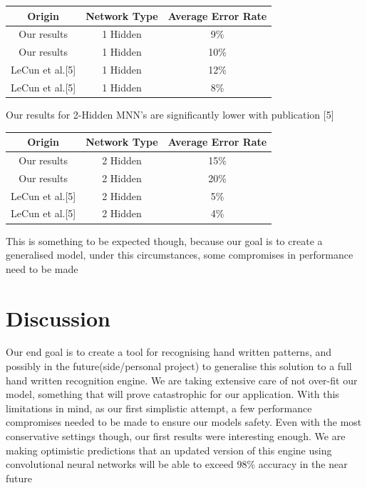 \documentclass{proc}
\begin{document}
	\begin{center}
		\begin{tabular}{ |c|c|c| }
			\hline
			Origin&Network Type&Average Error Rate \\
			\hline
			Our results&1 Hidden& 9\% \\
			Our results&1 Hidden& 10\% \\
			LeCun et al.[5]&1 Hidden  & 12\% \\
			LeCun et al.[5]&1 Hidden  & 8\% \\
			\hline
		\end{tabular}
	\end{center}
 
	Our results for 2-Hidden MNN's are significantly lower with publication [5]
	\begin{center}
		\begin{tabular}{ |c|c|c| }
			\hline
			Origin&Network Type&Average Error Rate \\
			\hline
			Our results&2 Hidden& 15\% \\
			Our results&2 Hidden& 20\% \\
			LeCun et al.[5]&2 Hidden  & 5\% \\
			LeCun et al.[5]&2 Hidden  & 4\% \\
			\hline
		\end{tabular}
	\end{center}

	This is something to be expected though, because our goal is to create a generalised model, under this circumstances, some compromises in performance need to be made
	
	\section{Discussion}
	Our end goal is to create a tool for recognising hand written patterns, and possibly in the future(side/personal project) to generalise this solution to a full hand written recognition engine. We are taking extensive care of not over-fit our model, something that will prove catastrophic for our application. With this limitations in mind, as our first simplistic attempt, a few performance compromises needed to be made to ensure our models safety. Even with the most conservative settings though, our first results were interesting enough. We are making optimistic predictions that an updated version of this engine using convolutional neural networks will be able to exceed 98\% accuracy in the near future
\end{document}
